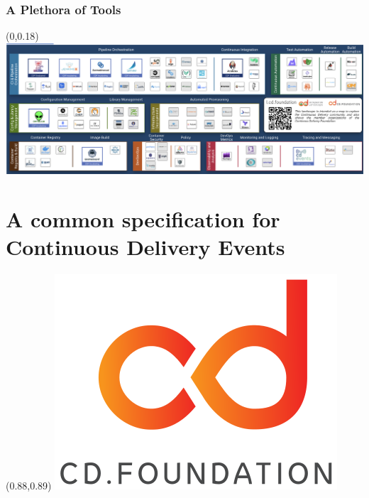 \documentclass[aspectratio=169,11pt,hyperref={colorlinks=true}]{beamer}
\begin{document}
\begin{grayframe}
  \frametitle{A Plethora of Tools}
  \begin{textblock*}{1.0\paperwidth}(0\paperwidth,0.18\paperheight)
    \includegraphics[width=1.0\paperwidth]{img/landscape.cd.foundation.png}
  \end{textblock*}
\end{grayframe}

\section[CDEvents]{A common specification for Continuous Delivery Events}

\begin{sectionwithpicmediumcentral}{
  \begin{textblock*}{0.07\paperwidth}(0.88\paperwidth,0.89\paperheight)
    \includegraphics[width=0.07\paperwidth]{img/cdf-stacked-color.png}
  \end{textblock*}
}
\end{sectionwithpicmediumcentral}
\end{document}
